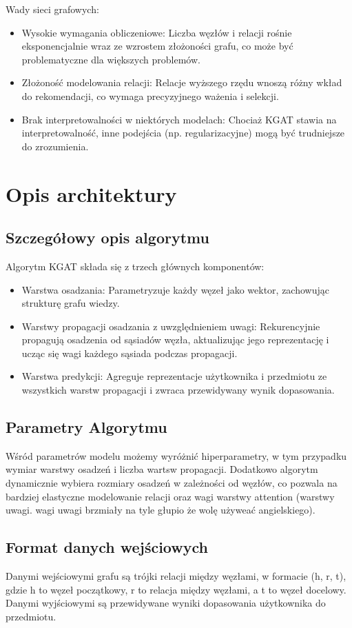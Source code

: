 \documentclass[a4paper,onecolumn]{LTJournalArticle}
\begin{document}
Wady sieci grafowych:
\begin{itemize}
	\item Wysokie wymagania obliczeniowe: Liczba węzłów i relacji rośnie eksponencjalnie wraz ze wzrostem złożoności grafu, co może być problematyczne dla większych problemów.
	\item Złożoność modelowania relacji: Relacje wyższego rzędu wnoszą różny wkład do rekomendacji, co wymaga precyzyjnego ważenia i selekcji.
	\item Brak interpretowalności w niektórych modelach: Chociaż KGAT stawia na interpretowalność, inne podejścia (np. regularizacyjne) mogą być trudniejsze do zrozumienia.
\end{itemize}
\section{Opis architektury}
\subsection{Szczegółowy opis algorytmu}
	
Algorytm KGAT składa się z trzech głównych komponentów:
\begin{itemize}
	\item Warstwa osadzania: Parametryzuje każdy węzeł jako wektor, zachowując strukturę grafu wiedzy.
	\item Warstwy propagacji osadzania z uwzględnieniem uwagi: Rekurencyjnie propagują osadzenia od sąsiadów węzła, aktualizując jego reprezentację i ucząc się wagi każdego sąsiada podczas propagacji.
	\item Warstwa predykcji: Agreguje reprezentacje użytkownika i przedmiotu ze wszystkich warstw propagacji i zwraca przewidywany wynik dopasowania.
\end{itemize}
\subsection{Parametry Algorytmu}
Wśród parametrów modelu możemy wyróżnić hiperparametry, w tym przypadku wymiar warstwy osadzeń i liczba wartsw propagacji. Dodatkowo algorytm dynamicznie wybiera rozmiary
osadzeń w zależności od węzłów, co pozwala na bardziej elastyczne modelowanie relacji oraz wagi warstwy attention (warstwy uwagi. wagi uwagi brzmiały na tyle głupio że wolę używeać angielskiego).
\subsection{Format danych wejściowych}
Danymi wejściowymi grafu są trójki relacji między węzłami, w formacie (h, r, t), gdzie h to węzeł początkowy, r to relacja między węzłami, a t to węzeł docelowy.\\
Danymi wyjściowymi są przewidywane wyniki dopasowania użytkownika do przedmiotu.
\end{document}
